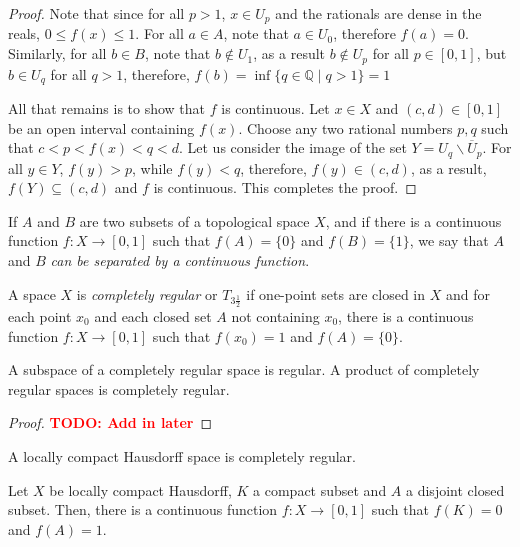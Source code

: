 \begin{proof}
    Note that since for all $p > 1$, $x\in U_p$ and the rationals are dense in the reals, $0\le f(x)\le 1$. For all $a\in A$, note that $a\in U_0$, therefore $f(a) = 0$. Similarly, for all $b\in B$, note that $b\notin U_1$, as a result $b\notin U_p$ for all $p\in[0,1]$, but $b\in U_q$ for all $q > 1$, therefore, $f(b) = \inf\{q\in\mathbb{Q}\mid q > 1\} = 1$

    All that remains is to show that $f$ is continuous. Let $x\in X$ and $(c,d)\in[0,1]$ be an open interval containing $f(x)$. Choose any two rational numbers $p,q$ such that $c < p < f(x) < q < d$. Let us consider the image of the set $Y = U_q\backslash\overline{U}_p$. For all $y\in Y$, $f(y) > p$, while $f(y) < q$, therefore, $f(y)\in(c,d)$, as a result, $f(Y)\subseteq (c,d)$ and $f$ is continuous. This completes the proof.
\end{proof}

\begin{definition}
    If $A$ and $B$ are two subsets of a topological space $X$, and if there is a continuous function $f:X\to[0,1]$ such that $f(A) = \{0\}$ and $f(B) = \{1\}$, we say that $A$ and $B$ \textit{can be separated by a continuous function}.
\end{definition}

\begin{definition}
    A space $X$ is \textit{completely regular} or $T_{3\frac{1}{2}}$ if one-point sets are closed in $X$ and for each point $x_0$ and each closed set $A$ not containing $x_0$, there is a continuous function $f:X\to[0,1]$ such that $f(x_0) = 1$ and $f(A) = \{0\}$.
\end{definition}

\begin{theorem}
    A subspace of a completely regular space is regular. A product of completely regular spaces is completely regular.
\end{theorem}
\begin{proof}
    \textbf{\textcolor{red}{TODO: Add in later}}
\end{proof}
\begin{corollary}
    A locally compact Hausdorff space is completely regular.
\end{corollary}

\begin{proposition}
    Let $X$ be locally compact Hausdorff, $K$ a compact subset and $A$ a disjoint closed subset. Then, there is a continuous function $f: X\to[0,1]$ such that $f(K) = 0$ and $f(A) = 1$.
\end{proposition}

